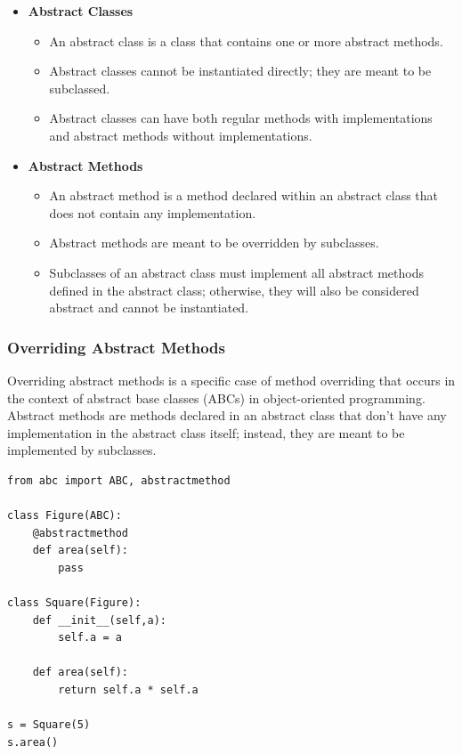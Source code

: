 \begin{itemize}
\item \textbf{Abstract Classes}
    \begin{itemize}
        \item An abstract class is a class that contains one or more abstract methods.
        \item Abstract classes cannot be instantiated directly; they are meant to be subclassed.
        \item Abstract classes can have both regular methods with implementations and abstract methods without implementations.
    \end{itemize}

\item \textbf{Abstract Methods}
    \begin{itemize}
        \item An abstract method is a method declared within an abstract class that does not contain any implementation.
        \item Abstract methods are meant to be overridden by subclasses.
        \item Subclasses of an abstract class must implement all abstract methods defined in the abstract class; otherwise, they will also be considered abstract and cannot be instantiated.
    \end{itemize}
\end{itemize}


\subsubsection{Overriding Abstract Methods}
Overriding abstract methods is a specific case of method overriding that occurs in the context of abstract base classes (ABCs) in object-oriented programming. Abstract methods are methods declared in an abstract class that don't have any implementation in the abstract class itself; instead, they are meant to be implemented by subclasses.

\begin{codebox}
\begin{verbatim}
from abc import ABC, abstractmethod

class Figure(ABC):
    @abstractmethod
    def area(self):
        pass
    
class Square(Figure):
    def __init__(self,a):
        self.a = a
    
    def area(self):
        return self.a * self.a

s = Square(5)
s.area()
\end{verbatim}
\end{codebox}

